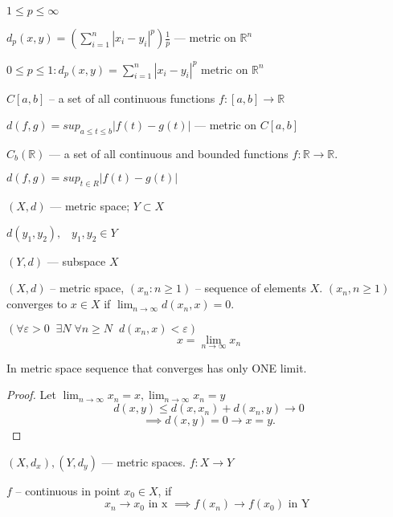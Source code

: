 \begin{example}
$1 \leq p \leq \infty$

 $d_{p}(x,y) = \left( \sum_{i=1}^n |x_{i} - y_{i}|^p \right) \frac{1}{p}$ — metric on $\mathbb{R}^n$

 $0 \leq p \leq 1 : d_{p}(x,y) = \sum_{i=1}^{n}|x_{i} - y_{i}|^p$ metric on $\mathbb{R}^n$
\end{example}

\begin{example}
$C[a,b]$ – a set of all continuous functions $f: [a,b] \to \mathbb{R}$

$d(f,g) = sup_{a \leq t \leq b} |f(t) - g(t)|$ — metric on $C[a,b]$
\end{example}

\begin{example}
$C_{b}(\mathbb{R})$ — a set of all continuous and bounded functions $f: \mathbb{R} \to \mathbb{R}$.

   $d(f, g) = sup_{t \in R} |f(t) - g(t)|$
\end{example}

\begin{example}
$(X, d)$ — metric space;
$Y \subset X$

$d(y_{1}, y_{2}), \;\;\; y_{1}, y_{2} \in Y$

$(Y, d)$ — subspace $X$
\end{example}

\hr

\begin{definition}
$(X,d)$ – metric space, $(x_{n}: n\geq 1)$ – sequence of elements $X$. 
$(x_{n}, n\geq 1)$ converges to $x \in X$ if $\lim_{ n \to \infty } d(x_{n}, x) = 0$.

$(\forall \varepsilon > 0 \;\; \exists N \; \forall n \geq N \;\; d(x_{n}, x)< \varepsilon)$
$$x = \lim_{ n \to \infty } x_{n}$$
\end{definition}

\begin{theorem}
In metric space sequence that converges has only ONE limit.
\end{theorem}
\begin{proof}
Let $\lim_{ n \to \infty }x_{n} = x, \lim_{ n \to \infty } x_{n} = y$
$$
d(x,y) \leq d(x, x_{n}) + d(x_{n}, y) \to 0
$$
$$
\implies d(x,y) = 0 \to x = y.
$$
\end{proof}


$(X, d_{x}), (Y, d_{y})$ — metric spaces. $f: X \to Y$
\begin{definition}
$f$ – continuous in point $x_{0} \in X$, if
	$$
x_{n} \to x_{0} \text{ in x } \implies f(x_{n}) \to f(x_{0}) \text{ in Y }
$$
\end{definition}

